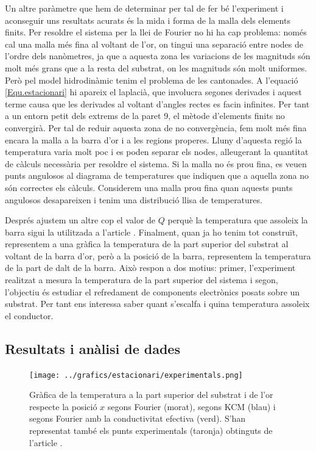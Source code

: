 \documentclass{article}
\begin{document}
Un altre par\`{a}metre que hem de determinar per tal de fer b\'{e} l'experiment i aconseguir uns resultats acurats \'{e}s la mida i forma de la malla dels elements finits. Per resoldre el sistema per la llei de Fourier no hi ha cap problema: nom\'{e}s cal una malla m\'{e}s fina al voltant de l'or, on tingui una separaci\'{o} entre nodes de l'ordre dels nan\`{o}metres, ja que a aquesta zona les variacions de les magnituds s\'{o}n molt m\'{e}s grans que a la resta del substrat, on les magnituds s\'{o}n molt uniformes. Per\`{o} pel model hidrodin\`{a}mic tenim el problema de les cantonades. A l'equaci\'{o} \eqref{Equ.estacionari} hi apareix el laplaci\`{a}, que involucra segones derivades i aquest terme causa que les derivades al voltant d'angles rectes es facin infinites. Per tant a un entorn petit dels extrems de la paret 9, el m\`{e}tode d'elements finits no convergir\`{a}. Per tal de reduir aquesta zona de no converg\`{e}ncia, fem molt m\'{e}s fina encara la malla a la barra d'or i a les regions properes. Lluny d'aquesta regi\'{o} la temperatura varia molt poc i es poden separar els nodes, alleugerant la quantitat de c\`{a}lculs necess\`{a}ria per resoldre el sistema. Si la malla no \'{e}s prou fina, es veuen punts angulosos al diagrama de temperatures que indiquen que a aquella zona no s\'{o}n correctes els c\`{a}lculs. Considerem una malla prou fina quan aquests punts angulosos desapareixen i tenim una distribuci\'{o} llisa de temperatures.

Despr\'{e}s ajustem un altre cop el valor de $Q$ perqu\`{e} la temperatura que assoleix la barra sigui la utilitzada a l'article \cite{torres2018emergence}. Finalment, quan ja ho tenim tot constru\"{i}t, representem a una gr\`{a}fica la temperatura de la part superior del substrat al voltant de la barra d'or, per\`{o} a la posici\'{o} de la barra, representem la temperatura de la part de dalt de la barra. Aix\`{o} respon a dos motius: primer, l'experiment realitzat a \cite{ziabari2017non} mesura la temperatura de la part superior del sistema i segon, l'objectiu \'{e}s estudiar el refredament de components electr\`{o}nics posats sobre un substrat. Per tant ens interessa saber quant s'escalfa i quina temperatura assoleix el conductor.

\subsection{Resultats i an\`{a}lisi de dades}

\begin{figure}[ht!]
\begin{center}
\texttt{[image: ../grafics/estacionari/experimentals.png]}
\caption{Gr\`{a}fica de la temperatura a la part superior del substrat i de l'or respecte la posici\'{o} $x$ segons Fourier (morat), segons KCM (blau) i segons Fourier amb la conductivitat efectiva (verd). S'han representat tamb\'{e} els punts experimentals (taronja) obtinguts de l'article \cite{torres2018emergence}.}
\label{Fig:Orexp}
\end{center}
\end{figure}
\end{document}
